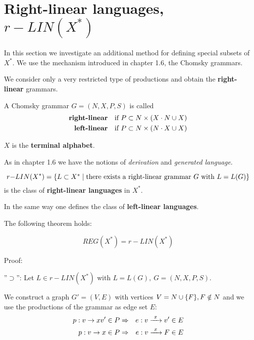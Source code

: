 \section{Right-linear languages, $r{-}LIN(X^*)$}

In this section we investigate an additional method for defining special subsets
of $X^*$. We use the mechanism introduced in chapter 1.6, the Chomsky grammars.

We consider only a very restricted type of productions and obtain the {\bf
right-linear} grammars.

\begin{definition}
A Chomsky grammar $G = (N, X, P, S)$ is called
\begin{eqnarray*}
\mbox{\bf right-linear} & & \mbox{if } P \subset N \times (X \cdot N \cup X) \\
\mbox{\bf left-linear}  & & \mbox{if } P \subset N \times (N \cdot X \cup X)
\end{eqnarray*}
\end{definition}

$X$ is the {\bf terminal alphabet}.

As in chapter 1.6 we have the notions of {\em derivation} and {\em generated
language}.

\begin{definition}
\[ r{-}LIN(X^*) = \mbox{$\{L \subset X^* \mid \mbox{there exists a right-linear
grammar $G$ with } L = L(G)\}$} \]
is the class of {\bf right-linear languages} in $X^*$.
\end{definition}

In the same way one defines the class of {\bf left-linear languages}.

The following theorem holds:

\begin{theorem}
\[ REG(X^*) = r{-}LIN(X^*) \]
\end{theorem}

Proof:

''$\supset$'': Let $L \in r{-}LIN(X^*)$ with $L = L(G),\ G = (N, X, P, S)$.

We construct a graph $G' = (V, E)$ with vertices $V = N \cup \mbox{$\{F\}$}, F
\notin N$ and we use the productions of the grammar as edge set $E$:
\begin{eqnarray*}
p: v \to x v' \in P & \Rightarrow & e:  v \xrightarrow{\ {x}\ } v' \in E \\
p: v \to x \in P & \Rightarrow & e : v \xrightarrow{\ {x}\ } F \in E
\end{eqnarray*} 


